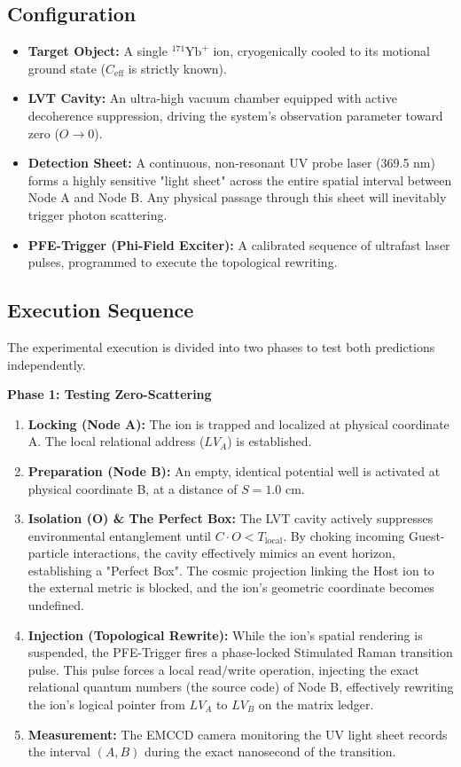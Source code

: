 \documentclass[12pt,a4paper]{article}
\begin{document}
\subsection{Configuration}
\begin{itemize}
    \item \textbf{Target Object:} A single $^{171}\text{Yb}^+$ ion, cryogenically cooled to its motional ground state ($C_{\mathrm{eff}}$ is strictly known).
    \item \textbf{LVT Cavity:} An ultra-high vacuum chamber equipped with active decoherence suppression, driving the system's observation parameter toward zero ($O \to 0$).
    \item \textbf{Detection Sheet:} A continuous, non-resonant UV probe laser (369.5 nm) forms a highly sensitive "light sheet" across the entire spatial interval between Node A and Node B. Any physical passage through this sheet will inevitably trigger photon scattering.
    \item \textbf{PFE-Trigger (Phi-Field Exciter):} A calibrated sequence of ultrafast laser pulses, programmed to execute the topological rewriting.
\end{itemize}



\subsection{Execution Sequence}
The experimental execution is divided into two phases to test both predictions independently.

\textbf{Phase 1: Testing Zero-Scattering}
\begin{enumerate}
    \item \textbf{Locking (Node A):} The ion is trapped and localized at physical coordinate A. The local relational address ($LV_A$) is established.
    \item \textbf{Preparation (Node B):} An empty, identical potential well is activated at physical coordinate B, at a distance of $S = 1.0$ cm. 
    \item \textbf{Isolation (O) \& The Perfect Box:} The LVT cavity actively suppresses environmental entanglement until $C \cdot O < T_{\mathrm{local}}$. By choking incoming Guest-particle interactions, the cavity effectively mimics an event horizon, establishing a "Perfect Box". The cosmic projection linking the Host ion to the external metric is blocked, and the ion's geometric coordinate becomes undefined.

\item \textbf{Injection (Topological Rewrite):} While the ion's spatial rendering is suspended, the PFE-Trigger fires a phase-locked Stimulated Raman transition pulse. This pulse forces a local read/write operation, injecting the exact relational quantum numbers (the source code) of Node B, effectively rewriting the ion's logical pointer from $LV_{A}$ to $LV_{B}$ on the matrix ledger.

    \item \textbf{Measurement:} The EMCCD camera monitoring the UV light sheet records the interval $(A, B)$ during the exact nanosecond of the transition.
\end{enumerate}
\end{document}
